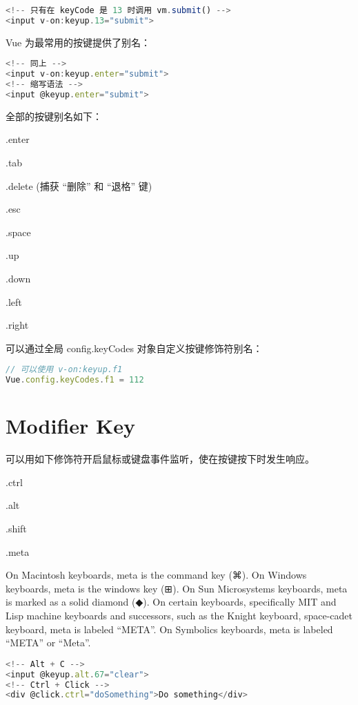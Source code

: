 \begin{lstlisting}[language=JavaScript]
<!-- 只有在 keyCode 是 13 时调用 vm.submit() -->
<input v-on:keyup.13="submit">
\end{lstlisting}

 Vue 为最常用的按键提供了别名：

\begin{lstlisting}[language=JavaScript]
<!-- 同上 -->
<input v-on:keyup.enter="submit">
<!-- 缩写语法 -->
<input @keyup.enter="submit">
\end{lstlisting}

全部的按键别名如下：

\begin{compactitem}
\item .enter
\item .tab
\item .delete (捕获 “删除” 和 “退格” 键)
\item .esc
\item .space
\item .up
\item .down
\item .left
\item .right
\end{compactitem}

可以通过全局 config.keyCodes 对象自定义按键修饰符别名：

\begin{lstlisting}[language=JavaScript]
// 可以使用 v-on:keyup.f1
Vue.config.keyCodes.f1 = 112
\end{lstlisting}







\section{Modifier Key}


可以用如下修饰符开启鼠标或键盘事件监听，使在按键按下时发生响应。


\begin{compactitem}
\item .ctrl
\item .alt
\item .shift
\item .meta
\end{compactitem}

On Macintosh keyboards, meta is the command key (⌘). On Windows keyboards, meta is the windows key (⊞). On Sun Microsystems keyboards, meta is marked as a solid diamond (◆). On certain keyboards, specifically MIT and Lisp machine keyboards and successors, such as the Knight keyboard, space-cadet keyboard, meta is labeled “META”. On Symbolics keyboards, meta is labeled “META” or “Meta”.

\begin{lstlisting}[language=JavaScript]
<!-- Alt + C -->
<input @keyup.alt.67="clear">
<!-- Ctrl + Click -->
<div @click.ctrl="doSomething">Do something</div>
\end{lstlisting}


\begin{lstlisting}[language=JavaScript]

\end{lstlisting}



\begin{lstlisting}[language=JavaScript]

\end{lstlisting}